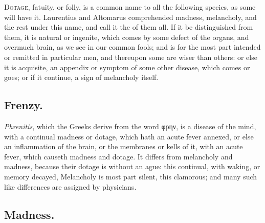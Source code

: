 \lettrine{D}{otage}, fatuity, or folly, is a common name to all the following
species, as some will have it. Laurentius and
Altomarus comprehended madness, melancholy, and the rest
under this name, and call it the  of them all. If it be
distinguished from them, it is natural or ingenite, which comes by some defect
of the organs, and overmuch brain, as we see in our common fools; and is for
the most part intended or remitted in particular men, and thereupon some are
wiser than others: or else it is acquisite, an appendix or symptom of some
other disease, which comes or goes; or if it continue, a sign of melancholy
itself.

\subsection{Frenzy.}

\emph{Phrenitis}, which the Greeks derive from the word \textgreek{φρην}, is a
disease of the mind, with a continual madness or dotage, which hath an acute
fever annexed, or else an inflammation of the brain, or the membranes or kells
of it, with an acute fever, which causeth madness and dotage. It differs from
melancholy and madness, because their dotage is without an ague: this
continual, with waking, or memory decayed, \etc{} Melancholy is most part
silent, this clamorous; and many such like differences are assigned by
physicians.

\subsection{Madness.}

